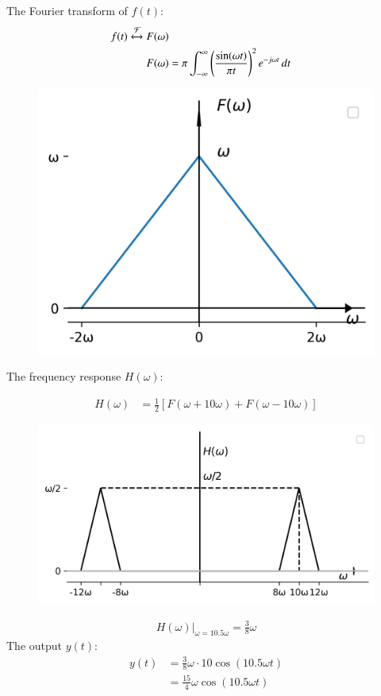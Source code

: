 \documentclass[journal,12pt,twocolumn]{IEEEtran}
\theoremstyle{remark}
\begin{document}
The Fourier transform of \(f(t)\):
\begin{align} 
f(t) \xleftrightarrow{\mathcal{F}} F(\omega)\\
 F(\omega)&= \pi\int_{-\infty}^{\infty}\left(\frac{\sin(\omega t)}{\pi t}\right)^2e^{-j\omega t}\,dt 
\end{align}
\begin{figure}[h!]
    \centering
    \includegraphics[width=\columnwidth]{figs/plot2.png}
    \caption{}
    \label{fig:sr2}
\end{figure}

\begin{enumerate}
The frequency response \(H(\omega)\):
\end{enumerate}
\begin{align}
H(\omega) &= \frac{1}{2} \left[F(\omega + 10\omega) + F(\omega - 10\omega)\right] 
\end{align}
\begin{figure}[h!]
    \centering
    \includegraphics[width=\columnwidth]{figs/plot3.png}
    \caption{}
    \label{fig:sr3}
\end{figure}
\begin{align}
H(\omega)\bigg|_{\omega=10.5\omega} = \frac{3}{8}\omega
\end{align}
The output \(y(t)\):
\begin{align}
y(t) &= \frac{3}{8}\omega \cdot 10 \cos(10.5 \omega t) \\
&= \frac{15}{4}\omega \cos(10.5 \omega t)
\end{align}
\end{document}
